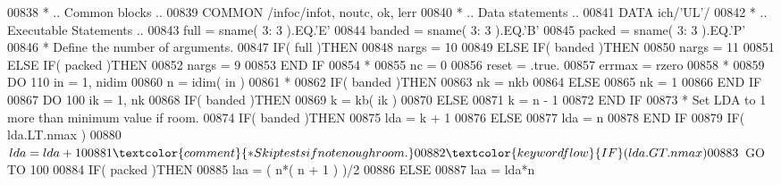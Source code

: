 \begin{DoxyCode}
00838 \textcolor{comment}{*     .. Common blocks ..}
00839       \textcolor{keyword}{COMMON}             /infoc/infot, noutc, ok, lerr
00840 \textcolor{comment}{*     .. Data statements ..}
00841       \textcolor{keyword}{DATA}               ich/\textcolor{stringliteral}{'UL'}/
00842 \textcolor{comment}{*     .. Executable Statements ..}
00843       full = sname( 3: 3 ).EQ.\textcolor{stringliteral}{'E'}
00844       banded = sname( 3: 3 ).EQ.\textcolor{stringliteral}{'B'}
00845       packed = sname( 3: 3 ).EQ.\textcolor{stringliteral}{'P'}
00846 \textcolor{comment}{*     Define the number of arguments.}
00847       \textcolor{keywordflow}{IF}( full )\textcolor{keywordflow}{THEN}
00848          nargs = 10
00849       \textcolor{keywordflow}{ELSE} \textcolor{keywordflow}{IF}( banded )\textcolor{keywordflow}{THEN}
00850          nargs = 11
00851       \textcolor{keywordflow}{ELSE} \textcolor{keywordflow}{IF}( packed )\textcolor{keywordflow}{THEN}
00852          nargs = 9
00853 \textcolor{keywordflow}{      END IF}
00854 \textcolor{comment}{*}
00855       nc = 0
00856       reset = .true.
00857       errmax = rzero
00858 \textcolor{comment}{*}
00859       \textcolor{keywordflow}{DO} 110 in = 1, nidim
00860          n = idim( in )
00861 \textcolor{comment}{*}
00862          \textcolor{keywordflow}{IF}( banded )\textcolor{keywordflow}{THEN}
00863             nk = nkb
00864          \textcolor{keywordflow}{ELSE}
00865             nk = 1
00866 \textcolor{keywordflow}{         END IF}
00867          \textcolor{keywordflow}{DO} 100 ik = 1, nk
00868             \textcolor{keywordflow}{IF}( banded )\textcolor{keywordflow}{THEN}
00869                k = kb( ik )
00870             \textcolor{keywordflow}{ELSE}
00871                k = n - 1
00872 \textcolor{keywordflow}{            END IF}
00873 \textcolor{comment}{*           Set LDA to 1 more than minimum value if room.}
00874             \textcolor{keywordflow}{IF}( banded )\textcolor{keywordflow}{THEN}
00875                lda = k + 1
00876             \textcolor{keywordflow}{ELSE}
00877                lda = n
00878 \textcolor{keywordflow}{            END IF}
00879             \textcolor{keywordflow}{IF}( lda.LT.nmax )
00880      $         lda = lda + 1
00881 \textcolor{comment}{*           Skip tests if not enough room.}
00882             \textcolor{keywordflow}{IF}( lda.GT.nmax )
00883      $         \textcolor{keywordflow}{GO TO} 100
00884             \textcolor{keywordflow}{IF}( packed )\textcolor{keywordflow}{THEN}
00885                laa = ( n*( n + 1 ) )/2
00886             \textcolor{keywordflow}{ELSE}
00887                laa = lda*n

\end{DoxyCode}
